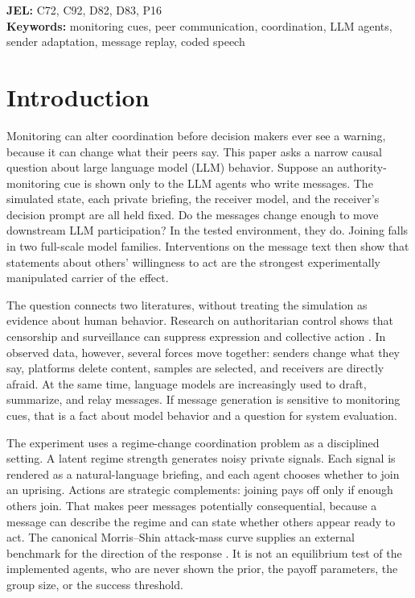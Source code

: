 \documentclass[12pt]{article}
\begin{document}
\medskip
\noindent\textbf{JEL:} C72, C92, D82, D83, P16 \\
\noindent\textbf{Keywords:} monitoring cues, peer communication, coordination, LLM agents, sender adaptation, message replay, coded speech
\vspace{1em}


\section{Introduction}

Monitoring can alter coordination before decision makers ever see a warning, because it can change what their peers say. This paper asks a narrow causal question about large language model (LLM) behavior. Suppose an authority-monitoring cue is shown only to the LLM agents who write messages. The simulated state, each private briefing, the receiver model, and the receiver's decision prompt are all held fixed. Do the messages change enough to move downstream LLM participation? In the tested environment, they do. Joining falls in two full-scale model families. Interventions on the message text then show that statements about others' willingness to act are the strongest experimentally manipulated carrier of the effect.

The question connects two literatures, without treating the simulation as evidence about human behavior. Research on authoritarian control shows that censorship and surveillance can suppress expression and collective action \citep{king2013, xu2021, penney2016, stoycheff2016}. In observed data, however, several forces move together: senders change what they say, platforms delete content, samples are selected, and receivers are directly afraid. At the same time, language models are increasingly used to draft, summarize, and relay messages. If message generation is sensitive to monitoring cues, that is a fact about model behavior and a question for system evaluation.

The experiment uses a regime-change coordination problem as a disciplined setting. A latent regime strength generates noisy private signals. Each signal is rendered as a natural-language briefing, and each agent chooses whether to join an uprising. Actions are strategic complements: joining pays off only if enough others join. That makes peer messages potentially consequential, because a message can describe the regime and can state whether others appear ready to act. The canonical Morris--Shin attack-mass curve supplies an external benchmark for the direction of the response \citep{carlsson1993, morris2003}. It is not an equilibrium test of the implemented agents, who are never shown the prior, the payoff parameters, the group size, or the success threshold.
\end{document}
